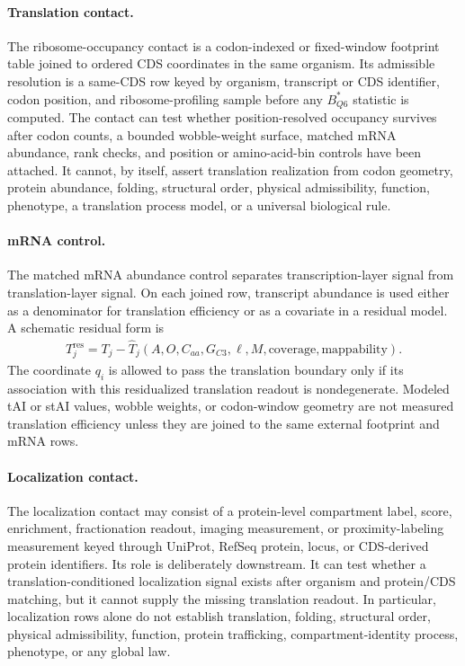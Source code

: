 \paragraph{Translation contact.}
The ribosome-occupancy contact is a codon-indexed or fixed-window footprint table joined to ordered CDS coordinates in the same organism.  Its admissible resolution is a same-CDS row keyed by organism, transcript or CDS identifier, codon position, and ribosome-profiling sample before any $B^*_{Q6}$ statistic is computed.  The contact can test whether position-resolved occupancy survives after codon counts, a bounded wobble-weight surface, matched mRNA abundance, rank checks, and position or amino-acid-bin controls have been attached.  It cannot, by itself, assert translation realization from codon geometry, protein abundance, folding, structural order, physical admissibility, function, phenotype, a translation process model, or a universal biological rule.

\paragraph{mRNA control.}
The matched mRNA abundance control separates transcription-layer signal from translation-layer signal.  On each joined row, transcript abundance is used either as a denominator for translation efficiency or as a covariate in a residual model.  A schematic residual form is
$$
\begin{aligned}
 T_j^{\mathrm{res}} = T_j - \widehat{T}_j(A,O,C_{aa},G_{C3},\ell,M,\text{coverage},\text{mappability}).
\end{aligned}
$$
The coordinate $q_i$ is allowed to pass the translation boundary only if its association with this residualized translation readout is nondegenerate.  Modeled tAI or stAI values, wobble weights, or codon-window geometry are not measured translation efficiency unless they are joined to the same external footprint and mRNA rows.

\paragraph{Localization contact.}
The localization contact may consist of a protein-level compartment label, score, enrichment, fractionation readout, imaging measurement, or proximity-labeling measurement keyed through UniProt, RefSeq protein, locus, or CDS-derived protein identifiers.  Its role is deliberately downstream.  It can test whether a translation-conditioned localization signal exists after organism and protein/CDS matching, but it cannot supply the missing translation readout.  In particular, localization rows alone do not establish translation, folding, structural order, physical admissibility, function, protein trafficking, compartment-identity process, phenotype, or any global law.

